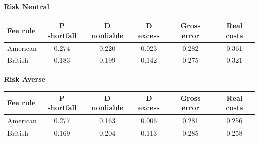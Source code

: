 \documentclass[10pt,border=5pt,varwidth=17cm]{standalone}
\begin{document}
\begingroup
\small
\setlength{\tabcolsep}{5pt}
\renewcommand{\arraystretch}{1.20}
\noindent\textbf{Risk Neutral}\par\smallskip
\noindent\begin{tabularx}{\linewidth}{@{}>{\raggedright\arraybackslash}Xccccc@{}}
\toprule
\textbf{Fee rule} & \textbf{P shortfall} & \textbf{D nonliable} & \textbf{D excess} & \textbf{Gross error} & \textbf{Real costs} \\
\midrule
American & 0.274 & 0.220 & 0.023 & 0.282 & 0.361 \\
British & 0.183 & 0.199 & 0.142 & 0.275 & 0.321 \\
\bottomrule\end{tabularx}\par\medskip
\noindent\textbf{Risk Averse}\par\smallskip
\noindent\begin{tabularx}{\linewidth}{@{}>{\raggedright\arraybackslash}Xccccc@{}}
\toprule
\textbf{Fee rule} & \textbf{P shortfall} & \textbf{D nonliable} & \textbf{D excess} & \textbf{Gross error} & \textbf{Real costs} \\
\midrule
American & 0.277 & 0.163 & 0.006 & 0.281 & 0.256 \\
British & 0.169 & 0.204 & 0.113 & 0.285 & 0.258 \\
\bottomrule\end{tabularx}\par\medskip
\endgroup
\end{document}
